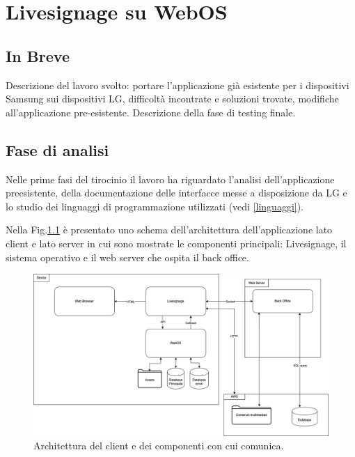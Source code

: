 \chapter{Livesignage su WebOS}\label{svolgimento}
\section{In Breve}
Descrizione del lavoro svolto: portare l'applicazione già esistente per i dispositivi Samsung sui dispositivi LG, difficoltà incontrate e soluzioni trovate, modifiche all'applicazione pre-esistente. Descrizione della fase di testing finale.

\section{Fase di analisi}

Nelle prime fasi del tirocinio il lavoro ha riguardato l'analisi dell'applicazione preesistente, della documentazione delle interfacce messe a disposizione da LG e lo studio dei linguaggi di programmazione utilizzati (vedi \ref*{linguaggi}).

Nella Fig.\ref*{fig:architettura_2} è presentato uno schema dell'architettura dell'applicazione lato client e lato server in cui sono mostrate le componenti principali: Livesignage, il sistema operativo e il web server che ospita il back office.

\begin{figure}[!htb]
    \centering
    \includegraphics[width= 1\textwidth]{images/svolgimento/webos_client_archi.png} 
    \caption{Architettura del client e dei componenti con cui comunica.} 
    \label{fig:architettura_2}
\end{figure}

